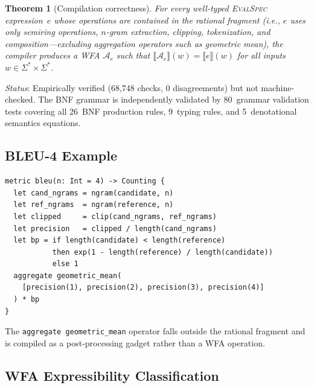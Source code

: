 \documentclass[11pt]{article}
\newtheorem{theorem}{Theorem}[section]
\newcommand{\evalspec}{\textsc{EvalSpec}}
\newcommand{\wfa}{\mathcal{A}}
\begin{document}
\begin{theorem}[Compilation correctness]\label{thm:compile}
For every well-typed \evalspec{} expression~$e$ whose operations are
contained in the rational fragment (i.e., $e$ uses only semiring
operations, $n$-gram extraction, clipping, tokenization, and
composition---excluding aggregation operators such as geometric mean),
the compiler produces a WFA $\wfa_e$ such that
$\llbracket\wfa_e\rrbracket(w) = \llbracket e \rrbracket(w)$
for all inputs~$w \in \Sigma^* \times \Sigma^*$.
\end{theorem}

\noindent\emph{Status}: Empirically verified (68{,}748 checks,
0 disagreements) but not machine-checked.  The BNF grammar is
independently validated by 80~grammar validation tests covering all
26~BNF production rules, 9~typing rules, and 5~denotational
semantics equations.

\subsection{BLEU-4 Example}

\begin{lstlisting}[language=EvalSpec,caption={BLEU-4 in \evalspec{}.}]
metric bleu(n: Int = 4) -> Counting {
  let cand_ngrams = ngram(candidate, n)
  let ref_ngrams  = ngram(reference, n)
  let clipped     = clip(cand_ngrams, ref_ngrams)
  let precision   = clipped / length(cand_ngrams)
  let bp = if length(candidate) < length(reference)
           then exp(1 - length(reference) / length(candidate))
           else 1
  aggregate geometric_mean(
    [precision(1), precision(2), precision(3), precision(4)]
  ) * bp
}
\end{lstlisting}

\noindent The \texttt{aggregate geometric\_mean} operator falls outside
the rational fragment and is compiled as a post-processing gadget
rather than a WFA operation.

\subsection{WFA Expressibility Classification}\label{app:expressibility}
\end{document}
